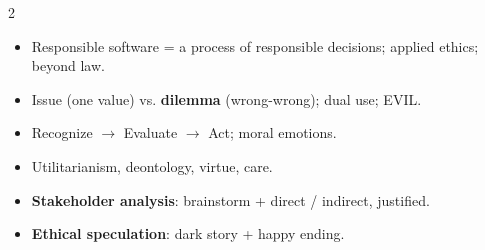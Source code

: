 \documentclass[a4paper,9pt]{extarticle}
\begin{document}
\begin{multicols}{2}
\begin{summary}

\begin{itemize}

\item Responsible software = a process of responsible decisions; applied ethics; beyond law.

\item Issue (one value) vs. \textbf{dilemma} (wrong-wrong); dual use; EVIL.

\item Recognize $\rightarrow$ Evaluate $\rightarrow$ Act; moral emotions.

\item Utilitarianism, deontology, virtue, care.

\item \textbf{Stakeholder analysis}: brainstorm + direct / indirect, justified.

\item \textbf{Ethical speculation}: dark story + happy ending.

\end{itemize}

\end{summary}


\end{multicols}
\end{document}
